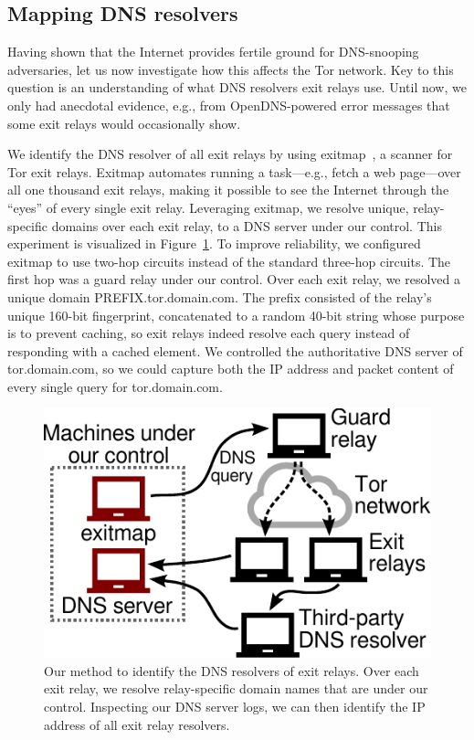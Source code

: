 \subsection{Mapping DNS resolvers}
\label{sec:mapping-resolvers}
Having shown that the Internet provides fertile ground for DNS-snooping
adversaries, let us now investigate how this affects the Tor network.  Key to
this question is an understanding of what DNS resolvers exit relays use.  Until
now, we only had anecdotal evidence, e.g., from OpenDNS-powered error messages
that some exit relays would occasionally show.

We identify the DNS resolver of all exit relays by using
exitmap~\cite{exitmap}, a scanner for Tor exit relays.  Exitmap automates
running a task---e.g., fetch a web page---over all one thousand exit relays,
making it possible to see the Internet through the ``eyes'' of every single
exit relay.  Leveraging exitmap, we resolve unique, relay-specific domains over
each exit relay, to a DNS server under our control.  This experiment is
visualized in Figure~\ref{fig:dnsenum}.  To improve reliability, we configured
exitmap to use two-hop circuits instead of the standard three-hop circuits.
The first hop was a guard relay under our control.  Over each exit relay, we
resolved a unique domain PREFIX.tor.domain.com.  The prefix consisted of the
relay's unique 160-bit fingerprint, concatenated to a random 40-bit string
whose purpose is to prevent caching, so exit relays indeed resolve each query
instead of responding with a cached element.  We controlled the authoritative
DNS server of tor.domain.com, so we could capture both the IP address and packet
content of every single query for tor.domain.com.

\begin{figure}[t]
	\centering
	\includegraphics[width=0.6\linewidth]{figures/resolver-identification.pdf}
	\caption{Our method to identify the DNS resolvers of exit relays.  Over
	each exit relay, we resolve relay-specific domain names that are under our
	control.  Inspecting our DNS server logs, we can then identify the IP
	address of all exit relay resolvers.}
	\label{fig:dnsenum}
\end{figure}


